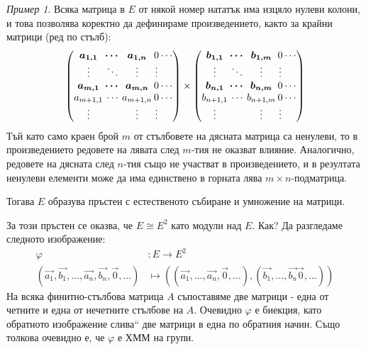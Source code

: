\documentclass{article}
\newif\ifusemulticols
\theoremstyle{definition}
\theoremstyle{remark}
\newtheorem{example}{Пример}[section]
\theoremstyle{plain}
\theoremstyle{plain}
\newenvironment{mymulticols}
    { \ifusemulticols \begin{multicols}{2} \fi }
    { \ifusemulticols \end{multicols} \fi }
\begin{document}
\begin{mymulticols}
\begin{example}
    Всяка матрица в $E$ от някой номер нататък има изцяло нулеви колони, и това позволява коректно
    да дефинираме произведението, както за крайни матрици (ред по стълб):
    \begin{equation*}
        \arraycolsep=1pt
        \begin{pmatrix}
            \boldsymbol{a_{1,1}} & \boldsymbol{\cdots} & \boldsymbol{a_{1,n}} & 0 & \cdots\\
            \boldsymbol{\vdots} & \boldsymbol{\ddots} & \boldsymbol{\vdots} & \vdots\\
            \boldsymbol{a_{m,1}} & \boldsymbol{\cdots} & \boldsymbol{a_{m,n}} & 0 & \cdots \\
            a_{m+1,1} & \cdots & a_{m+1,n} & 0 & \cdots \\
            \vdots &  & \vdots & \vdots
        \end{pmatrix}
        \times
        \begin{pmatrix}
            \boldsymbol{b_{1,1}} & \boldsymbol{\cdots} & \boldsymbol{b_{1,m}} & 0 & \cdots\\
            \boldsymbol{\vdots} & \boldsymbol{\ddots} & \boldsymbol{\vdots} & \vdots\\
            \boldsymbol{b_{n,1}} & \boldsymbol{\cdots} & \boldsymbol{b_{n,m}} & 0 & \cdots \\
            b_{n+1,1} & \cdots & b_{n+1,m} & 0 & \cdots \\
            \vdots &  & \vdots & \vdots
        \end{pmatrix}
    \end{equation*}
    Тъй като само краен брой $m$ от стълбовете на дясната матрица са ненулеви, то в произведението
    редовете на лявата след $m$-тия не оказват влияние. Аналогично, редовете на дясната след $n$-тия
    също не участват в произведението, и в резултата ненулеви елементи може да има единствено в
    горната лява $m\times n$-подматрица.

    Тогава $E$ образува пръстен с естественото събиране и умножение на матрици.

    За този пръстен се оказва, че $E\cong E^2$ като модули над $E$. Как?
    Да разгледаме следното изображение:
    \begin{align*}
        \varphi &: E \to E^2\\
        \left( \vec{a_1}, \vec{b_1}, \dots ,\vec{a_n}, \vec{b_n}, \vec 0,\dots \right) & \mapsto
            \left(
                \left( \vec{a_1}, ..., \vec{a_n}, \vec 0, ... \right),
                \left( \vec{b_1}, ..., \vec{b_n}  \vec 0, ... \right)
            \right)
    \end{align*}
    На всяка финитно-стълбова матрица $A$ съпоставяме две матрици - една от четните и една от
    нечетните стълбове на $A$. Очевидно $\varphi$ е биекция, като обратното изображение
    \quotedblbase слива`` две матрици в една по обратния начин. Също толкова очевидно е, че
    $\varphi$ е ХММ на групи.


\end{example}
\end{mymulticols}
\end{document}
